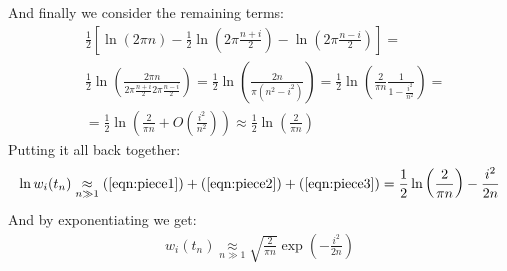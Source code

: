 \documentclass[../template.tex]{subfiles}
\begin{document}
And finally we consider the remaining terms:
\begin{align}\nonumber
    &\frac{1}{2}\left[\ln(2 \pi n) - \frac{1}{2} \ln\left(2 \pi \frac{n+i}{2} \right) - \ln\left(2 \pi \frac{n-i}{2} \right) \right] =\\ \nonumber
    &\frac{1}{2} \ln \left(\frac{2 \pi n}{ 2 \pi \frac{n+i}{2}  2 \pi \frac{n-i}{2} } \right)   =\frac{1}{2} \ln \left(\frac{2n}{\pi (n^2 - i^2)} \right)  = \frac{1}{2}\ln \left(\frac{2}{\pi n} \frac{1}{1-\frac{i^2}{n^2} }  \right) =\\
    &= \frac{1}{2} \ln \left(\frac{2}{\pi n} + O\left(\frac{i^2}{n^2} \right) \right) \approx \frac{1}{2} \ln\left(\frac{2}{\pi n} \right)
    \label{eqn:piece3} 
\end{align}
Putting it all back together:
\begin{align*}
    \ln w_i(t_n) \underset{n \gg 1}{\approx} (\ref{eqn:piece1}) + (\ref{eqn:piece2}) + (\ref{eqn:piece3}) = \frac{1}{2}\ln\left(\frac{2}{\pi n} \right) -\frac{i^2}{2n}
\end{align*}
And by exponentiating we get:
\begin{align*}
    w_i(t_n) \underset{n \gg 1}{\approx}  \sqrt{\frac{2}{\pi n} } \exp\left(-\frac{i^2}{2n} \right)
\end{align*}
\end{document}
